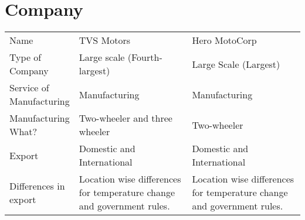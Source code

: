 \setcounter{page}{1}
\section{Company}
\begin{tabular}{|p{0.2\linewidth}|p{0.4\linewidth}|p{0.4\linewidth}|}
	\hline
	Name & TVS Motors & Hero MotoCorp\\
	Type of Company & Large scale (Fourth-largest) & Large Scale (Largest)\\
	Service of Manufacturing & Manufacturing & Manufacturing\\
	Manufacturing What? & Two-wheeler and three wheeler & Two-wheeler \\
	Export & Domestic and International & Domestic and International\\
	Differences in export & Location wise differences for temperature change and government rules. & Location wise differences for temperature change and government rules.\\
	\hline
\end{tabular}